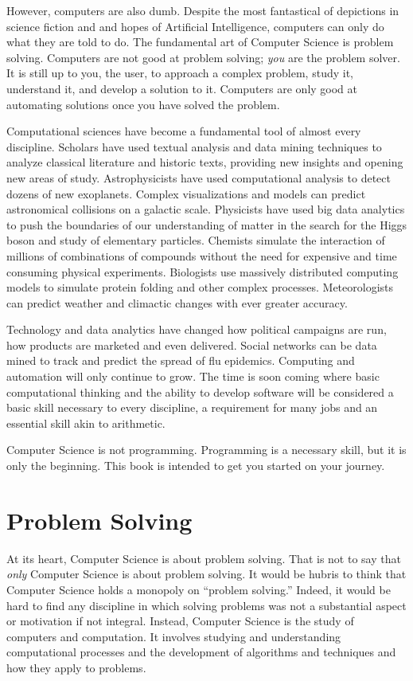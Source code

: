 However, computers are also dumb.  Despite the most fantastical of depictions
in science fiction and and hopes of Artificial Intelligence, computers can only do 
what they are told to do.  The fundamental art of Computer Science is problem 
solving.  Computers are not good at problem solving; \emph{you} are the problem 
solver.  It is still up to you, the user, to approach a complex problem, study it, 
understand it, and develop a solution to it.  Computers are only good at automating 
solutions once you have solved the problem.

Computational sciences have become a fundamental tool of almost every
discipline.  Scholars have used textual analysis and data mining techniques to
analyze classical literature and historic texts, providing new insights and opening
new areas of study.  Astrophysicists have used computational analysis to
detect dozens of new exoplanets.  Complex visualizations and models can 
predict astronomical collisions on a galactic scale.  Physicists have used big 
data analytics to push the boundaries of our understanding of matter in the 
search for the Higgs boson and study of elementary particles.  Chemists 
simulate the interaction of millions of combinations of compounds without
the need for expensive and time consuming physical experiments.  
Biologists use massively distributed computing models to simulate 
protein folding and other complex processes.  Meteorologists can 
predict weather and climactic changes with ever greater accuracy.

Technology and data analytics have changed how political campaigns
are run, how products are marketed and even delivered.
Social networks can be data mined to track and predict the spread of flu
epidemics.  Computing and automation will only continue to grow.
The time is soon coming where basic computational thinking and the 
ability to develop software will be considered a basic skill necessary 
to every discipline, a requirement for many jobs and an 
essential skill akin to arithmetic.

Computer Science is not programming.  Programming is a necessary skill, but
it is only the beginning.  This book is intended to get you started
on your journey.

\section{Problem Solving}

At its heart, Computer Science is about problem solving.  That is not to say that \emph{only} Computer Science is about problem solving.  It would be hubris to think that Computer Science holds a monopoly on ``problem solving.''  Indeed, it would be hard to find any 
discipline in which solving problems was not a substantial aspect or 
motivation if not integral.  Instead, Computer Science is the study of
computers and computation.  It involves studying and understanding 
computational processes and the development of algorithms and techniques 
and how they apply to problems.

